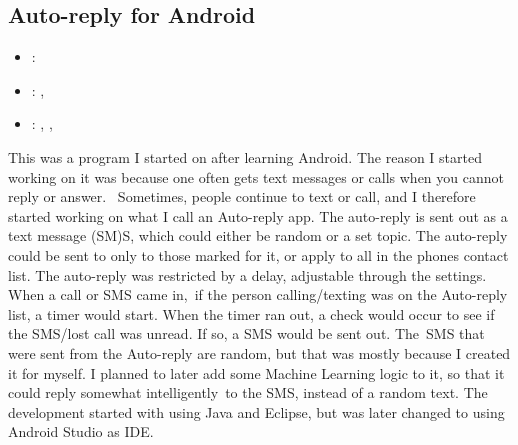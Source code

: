 \subsection{Auto-reply for Android}
\label{sec:auto_reply_android}
\begin{itemize} 
	\item {}: 
	\item {}: , 
	\item {}: , , 
\end{itemize} 
This was a program I started on after learning Android. 
The reason I started working on it was because one often gets text messages or calls when you cannot reply or answer. 
Sometimes, people continue to text or call, and I therefore started working on what I call an Auto-reply app. 
The auto-reply is sent out as a text message (SM)S, which could either be random or a set topic.
\vspace{0.5em}\newline
The auto-reply could be sent to only to those marked for it, or apply to all in the phones contact list. 
The auto-reply was restricted by a delay, adjustable through the settings. 
When a call or SMS came in, if the person calling/texting was on the Auto-reply list, a timer would start. 
When the timer ran out, a check would occur to see if the SMS/lost call was unread. If so, a SMS would be sent out. 
\vspace{0.5em}\newline
The SMS that were sent from the Auto-reply are random, but that was mostly because I created it for myself. 
I planned to later add some Machine Learning logic to it, so that it could reply somewhat intelligently to the SMS, instead of a random text.
\vspace{0.5em}\newline
The development started with using Java and Eclipse, but was later changed to using Android Studio as IDE.
